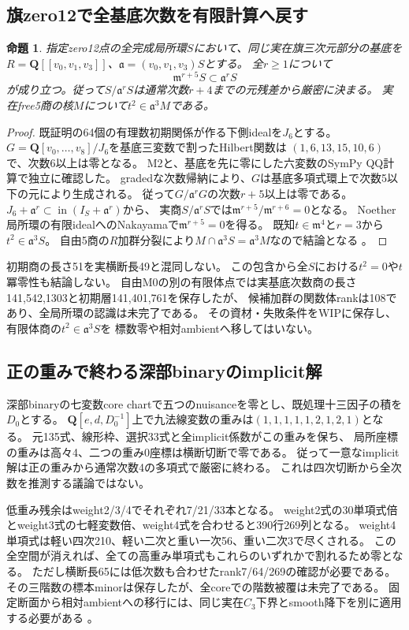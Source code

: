 \documentclass[11pt,a4paper]{ltjsarticle}
\newcommand{\QQ}{\mathbf Q}
\newtheorem{proposition}[theorem]{命題}
\theoremstyle{remark}
\begin{document}
\subsection{旗zero12で全基底次数を有限計算へ戻す}
\begin{proposition}
指定zero12点の全完成局所環$S$において、同じ実在旗三次元部分の基底を
$R=\QQ[[v_0,v_1,v_3]]$、$\mathfrak a=(v_0,v_1,v_3)S$とする。
全$r\ge1$について
\[
 \mathfrak m^{r+5}S\subset\mathfrak a^rS
\]
が成り立つ。従って$S/\mathfrak a^rS$は通常次数$r+4$までの元残差から厳密に決まる。
実在free5商の核$M$について$t^2\in\mathfrak a^3M$である。
\end{proposition}
\begin{proof}
既証明の64個の有理数初期関係が作る下側idealを$J_6$とする。
$G=\QQ[v_0,\ldots,v_8]/J_6$を基底三変数で割ったHilbert関数は
$(1,6,13,15,10,6)$で、次数6以上は零となる。
M2と、基底を先に零にした六変数のSymPy QQ計算で独立に確認した。
gradedな次数帰納により、$G$は基底多項式環上で次数5以下の元により生成される。
従って$G/\mathfrak a^rG$の次数$r+5$以上は零である。
$J_6+\mathfrak a^r\subset\operatorname{in}(I_S+\mathfrak a^r)$から、
実商$S/\mathfrak a^rS$では$\mathfrak m^{r+5}/\mathfrak m^{r+6}=0$となる。
Noether局所環の有限idealへのNakayamaで$\mathfrak m^{r+5}=0$を得る。
既知$t\in\mathfrak m^4$と$r=3$から$t^2\in\mathfrak a^3S$。
自由5商の$R$加群分裂により$M\cap\mathfrak a^3S=\mathfrak a^3M$なので結論となる
\cite{zero12-adic-v53,zero12-adic-review-v53}。
\end{proof}
初期商の長さ51を実横断長49と混同しない。
この包含から全$S$における$t^2=0$や$t$冪零性も結論しない。
自由M0の別の有限体点では実基底次数商の長さ141,542,1303と初期層141,401,761を保存したが、
候補加群の関数体rankは108であり、全局所環の認識は未完了である。
その資材・失敗条件をWIPに保存し、有限体商の$t^2\in\mathfrak a^3S$を
標数零や相対ambientへ移してはいない\cite{free-adic-wip-v53}。

\subsection{正の重みで終わる深部binaryのimplicit解}
深部binaryの七変数core chartで五つのnuisanceを零とし、既処理十三因子の積を$D_0$とする。
$\QQ[e,d,D_0^{-1}]$上で九法線変数の重みは$(1,1,1,1,1,2,1,2,1)$となる。
元135式、線形枠、選択33式と全implicit係数がこの重みを保ち、
局所座標の重みは高々4、二つの重み0座標は横断切断で零である。
従って一意なimplicit解は正の重みから通常次数4の多項式で厳密に終わる。
これは四次切断から全次数を推測する議論ではない。

低重み残余はweight2/3/4でそれぞれ7/21/33本となる。
weight2式の30単項式倍とweight3式の七軽変数倍、weight4式を合わせると390行269列となる。
weight4単項式は軽い四次210、軽い二次と重い一次56、重い二次3で尽くされる。
この全空間が消えれば、全ての高重み単項式もこれらのいずれかで割れるため零となる。
ただし横断長65には低次数も合わせたrank7/64/269の確認が必要である。
その三階数の標本minorは保存したが、全coreでの階数被覆は未完了である。
固定断面から相対ambientへの移行には、同じ実在$C_3$下界とsmooth降下を別に適用する必要がある
\cite{binary-weighted-v53}。
\end{document}
